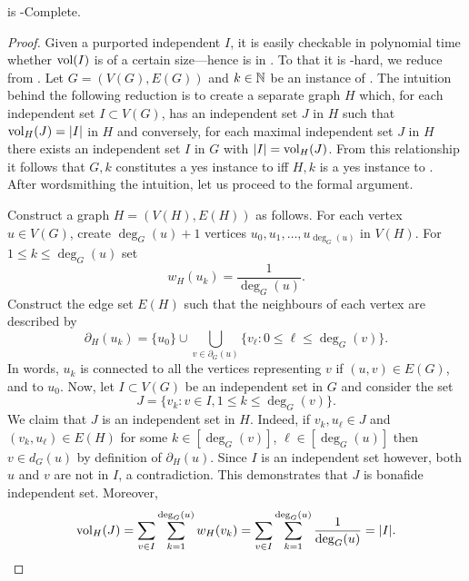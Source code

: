 \begin{lemma}
	\label{lem:vwis}
	\vwis is \NP-Complete. 
\end{lemma}
\begin{proof}
	Given a purported independent $I$, it is easily checkable in polynomial time whether $\textnormal{vol}(I)$ is of a certain size---hence \vwis is in \NP. 
	To that it is \NP-hard, we reduce from \iset. Let $G=(V(G),E(G))$ and  $k\in\mathbb{N}$ be an instance of \iset. The intuition behind the following reduction is to create a separate graph $H$ which, for each independent set $I\subset V(G)$, has an independent set $J$ in $H$ such that  $\textnormal{vol}_H(J)=|I|$ in $H$ and conversely, for each maximal independent set $J$ in $H$ there exists an independent set $I$ in $G$ with $|I| = \textnormal{vol}_H(J)$. From this relationship it follows that $G,k$ constitutes a yes instance to \iset iff $H,k$ is a yes instance to \mwis.  After wordsmithing the intuition, let us proceed to the formal argument. 

	Construct a graph $H=(V(H), E(H))$ as follows. For each vertex $u\in V(G)$, create $\deg_G(u)+1$ vertices $u_0,u_1,\dots,u_{\deg_G(u)}$ in $V(H)$. For $1\leq k\leq \deg_G(u)$ set \[w_H(u_k) =  \frac{1}{\deg_G(u)}.\] Construct the edge set $E(H)$ such that the neighbours of each vertex are described by 
	\begin{equation*}
	\partial_{H}(u_k) = \{u_0\}\cup \bigcup_{v\in \partial_G(u)}\{v_\ell: 0\leq \ell\leq \deg_G(v) \}.
 	\end{equation*}
	In words, $u_k$ is connected to all the vertices representing $v$ if $(u,v)\in E(G)$, and to $u_0$. Now, let $I\subset V(G)$ be an independent set in $G$ and consider the set
	\[J = \{v_k: v\in I, 1\leq k\leq \deg_G(v)\}.\]
	We claim that $J$ is an independent set in $H$. 
	Indeed, if $v_k,u_\ell\in J$ and  $(v_k,u_\ell) \in E(H)$ for some $k\in[\deg_G(v)]$, $\ell\in[\deg_G(u)]$ then $v\in d_G(u)$ by definition of $\partial_H(u)$. Since $I$ is an independent set however, both $u$ and $v$ are not in $I$, a contradiction. This demonstrates that $J$ is bonafide independent set. Moreover, 
	\[\textnormal{vol}_H(J) = \sum_{v\in I}\sum_{k=1}^{\deg_G(u)} w_H(v_k) = \sum_{v\in I}\sum_{k=1}^{\deg_G(u)} \frac{1}{\deg_G(u)} = |I|.\]


\end{proof}
